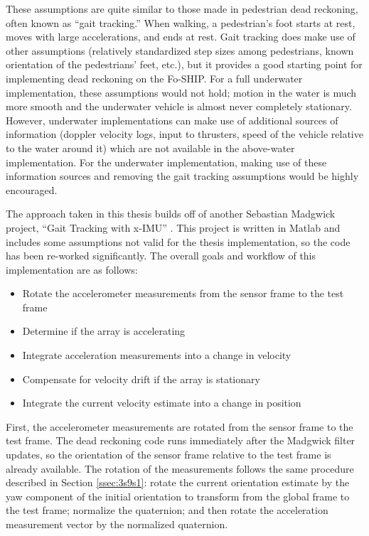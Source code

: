 \documentclass[12pt,a4paper]{report}
\begin{document}
These assumptions are quite similar to those made in pedestrian dead reckoning, often known as “gait tracking.” When walking, a pedestrian’s foot starts at rest, moves with large accelerations, and ends at rest. Gait tracking does make use of other assumptions (relatively standardized step sizes among pedestrians, known orientation of the pedestrians’ feet, etc.), but it provides a good starting point for implementing dead reckoning on the Fo-SHIP. For a full underwater implementation, these assumptions would not hold; motion in the water is much more smooth and the underwater vehicle is almost never completely stationary. However, underwater implementations can make use of additional sources of information (doppler velocity logs, input to thrusters, speed of the vehicle relative to the water around it) which are not available in the above-water implementation. For the underwater implementation, making use of these information sources and removing the gait tracking assumptions would be highly encouraged.

The approach taken in this thesis builds off of another Sebastian Madgwick project, “Gait Tracking with x-IMU” \cite{madgstep}. This project is written in Matlab and includes some assumptions not valid for the thesis implementation, so the code has been re-worked significantly. The overall goals and workflow of this implementation are as follows:
\begin{itemize}[noitemsep,topsep=0pt,]
	\item Rotate the accelerometer measurements from the sensor frame to the test frame
	\item Determine if the array is accelerating
	\item Integrate acceleration measurements into a change in velocity
	\item Compensate for velocity drift if the array is stationary
	\item Integrate the current velocity estimate into a change in position
\end{itemize}

First, the accelerometer measurements are rotated from the sensor frame to the test frame. The dead reckoning code runs immediately after the Madgwick filter updates, so the orientation of the sensor frame relative to the test frame is already available. The rotation of the measurements follows the same procedure described in Section \ref{ssec:3s9s1}: rotate the current orientation estimate by the yaw component of the initial orientation to transform from the global frame to the test frame; normalize the quaternion; and then rotate the acceleration measurement vector by the normalized quaternion.
\end{document}
